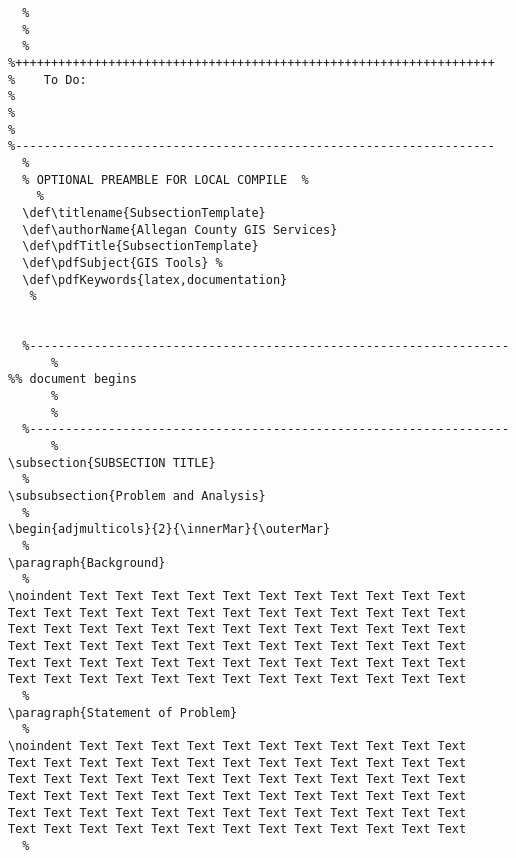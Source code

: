\begin{verbatim}
  %
  %
  %
%+++++++++++++++++++++++++++++++++++++++++++++++++++++++++++++++++++
%    To Do:
%
%
%
%-------------------------------------------------------------------
  %
  % OPTIONAL PREAMBLE FOR LOCAL COMPILE  %
    %
  \def\titlename{SubsectionTemplate}
  \def\authorName{Allegan County GIS Services}
  \def\pdfTitle{SubsectionTemplate}
  \def\pdfSubject{GIS Tools} %
  \def\pdfKeywords{latex,documentation}
   %
  

  %-------------------------------------------------------------------
      %
%% document begins
      %
      %
  %-------------------------------------------------------------------
      %
\subsection{SUBSECTION TITLE}
  %
\subsubsection{Problem and Analysis}
  %
\begin{adjmulticols}{2}{\innerMar}{\outerMar}
  %
\paragraph{Background}
  %
\noindent Text Text Text Text Text Text Text Text Text Text Text 
Text Text Text Text Text Text Text Text Text Text Text Text Text
Text Text Text Text Text Text Text Text Text Text Text Text Text
Text Text Text Text Text Text Text Text Text Text Text Text Text
Text Text Text Text Text Text Text Text Text Text Text Text Text
Text Text Text Text Text Text Text Text Text Text Text Text Text
  %
\paragraph{Statement of Problem}
  %
\noindent Text Text Text Text Text Text Text Text Text Text Text 
Text Text Text Text Text Text Text Text Text Text Text Text Text
Text Text Text Text Text Text Text Text Text Text Text Text Text
Text Text Text Text Text Text Text Text Text Text Text Text Text
Text Text Text Text Text Text Text Text Text Text Text Text Text
Text Text Text Text Text Text Text Text Text Text Text Text Text
  %

\end{verbatim}
